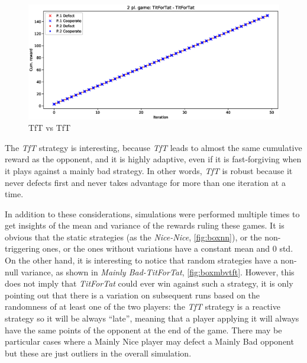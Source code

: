 \documentclass[journal,10pt,twoside]{IEEEtran}
\begin{document}
\begin{figure}[!ht]
    \centering
    \includegraphics[width=1\columnwidth]{../img/ipd2p/ipd2p-rewards-TitForTat-TitForTat}
    \caption{TfT vs TfT}
    \label{fig:tftvstft}
\end{figure}

The \textit{TfT} strategy is interesting, because \textit{TfT} leads to almost the same cumulative reward as the opponent, and it is highly adaptive, even if it is fast-forgiving when it plays against a mainly bad strategy. In other words, \textit{TfT} is robust because it never defects first and never takes advantage for more than one iteration at a time.~\cite{fogelEvolvingBehaviors}

In addition to these considerations, simulations were performed multiple times to get insights of the mean and variance of the rewards ruling these games. It is obvious that the static strategies (as the \textit{Nice-Nice}, \autoref{fig:boxnn}), or the non-triggering ones, or the ones without variations have a constant mean and $0$ std. On the other hand, it is interesting to notice that random strategies have a non-null variance, as shown in \textit{Mainly Bad-TitForTat}, \autoref{fig:boxmbvtft}. However, this does not imply that \textit{TitForTat} could ever win against such a strategy, it is only pointing out that there is a variation on subsequent runs based on the randomness of at least one of the two players: the \textit{TfT} strategy is a reactive strategy so it will be always ``late'', meaning that a player applying it will always have the same points of the opponent at the end of the game. There may be particular cases where a Mainly Nice player may defect a Mainly Bad opponent but these are just outliers in the overall simulation.
\end{document}

